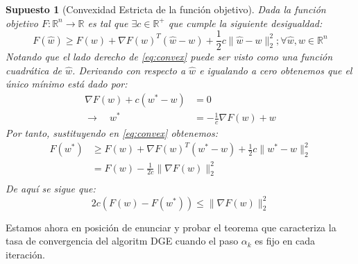 \documentclass{book}
\theoremstyle{plain}
\newtheorem{assump}{Supuesto}[thm]
\theoremstyle{definition}
\theoremstyle{remark}
\begin{document}
\begin{assump}[Convexidad Estricta de la función objetivo]\label{assump:convex}
Dada la función objetivo $F:\mathbb{R}^n\rightarrow\mathbb{R}$ es tal que $\exists c \in \mathbb{R}^+$ que cumple la siguiente desigualdad: 
\begin{equation}\label{eq:convex}
    F(\hat{w}) \geq F(w) + \nabla F(w)^T(\hat{w}-w) + \frac{1}{2}c\|\hat{w}-w\|^2_2; \forall \hat{w}, w \in \mathbb{R}^n
\end{equation}
Notando que el lado derecho de \ref{eq:convex} puede ser visto como una función cuadrática de $\hat{w}$. Derivando con respecto a $\hat{w}$ e igualando a cero obtenemos que el único mínimo está dado por: 
\begin{equation*}
\begin{split}
    \nabla F(w) + c(w^* - w)  & = 0 \\
    \rightarrow \quad w^* & = -\frac{1}{c} \nabla F(w) + w
\end{split}
\end{equation*}
Por tanto, sustituyendo en \ref{eq:convex} obtenemos:
\begin{equation}\label{eq:convex2}
    \begin{split}
        F(w^*) & \geq F(w) + \nabla F(w)^T(w^*-w) + \frac{1}{2}c\|w^*-w\|^2_2 \\
        & = F(w) - \frac{1}{2c}\|\nabla F(w)\|_2^2 \\
    \end{split}
\end{equation}
De aquí se sigue que:
\begin{equation}
        2c(F(w)-F(w^*))  \leq  \|\nabla F(w)\|_2^2 
\end{equation}
\end{assump}

Estamos ahora en posición de enunciar y probar el teorema que caracteriza la tasa de convergencia del algoritm DGE cuando el paso $\alpha_k$ es fijo en cada iteración. 
\end{document}
